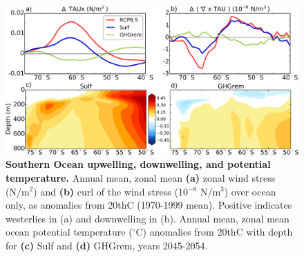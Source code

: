 \documentclass{nature}
\begin{document}
\begin{figure}%
 \noindent\includegraphics[width=35pc]{figures/TAUcurl_TEMPanomMOCeddy+eul.pdf}
\caption{\textbf{Southern Ocean upwelling, downwelling, and potential temperature.} Annual mean, zonal mean \textbf{(a)} zonal wind stress (N/m$^2$) and \textbf{(b)} curl of the wind stress (10$^{-8}$ N/m$^3$) over ocean only, as anomalies from 20thC (1970-1999 mean). Positive indicates westerlies in (a) and downwelling in (b). Annual mean, zonal mean ocean potential temperature ($^\circ$C) anomalies from 20thC with depth for \textbf{(c)} Sulf and \textbf{(d)} GHGrem, years 2045-2054.}
\label{fig:zmtautemp}
\end{figure}
\end{document}
